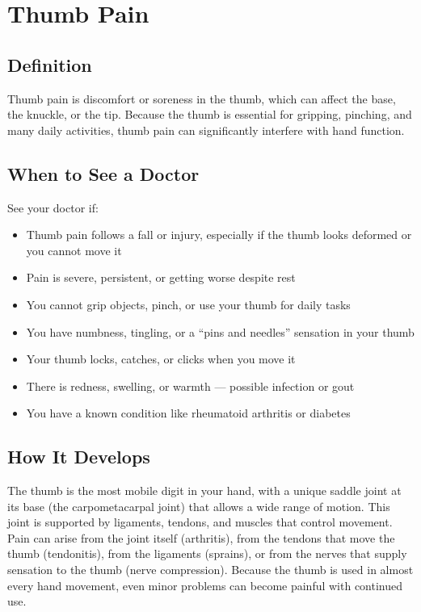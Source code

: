 \chapter{Thumb Pain}

\section*{Definition}
Thumb pain is discomfort or soreness in the thumb, which can affect the base, the knuckle, or the tip. Because the thumb is essential for gripping, pinching, and many daily activities, thumb pain can significantly interfere with hand function.

\section*{When to See a Doctor}
See your doctor if:
\begin{itemize}
  \item Thumb pain follows a fall or injury, especially if the thumb looks deformed or you cannot move it
  \item Pain is severe, persistent, or getting worse despite rest
  \item You cannot grip objects, pinch, or use your thumb for daily tasks
  \item You have numbness, tingling, or a ``pins and needles'' sensation in your thumb
  \item Your thumb locks, catches, or clicks when you move it
  \item There is redness, swelling, or warmth — possible infection or gout
  \item You have a known condition like rheumatoid arthritis or diabetes
\end{itemize}

\section*{How It Develops}
The thumb is the most mobile digit in your hand, with a unique saddle joint at its base (the carpometacarpal joint) that allows a wide range of motion. This joint is supported by ligaments, tendons, and muscles that control movement. Pain can arise from the joint itself (arthritis), from the tendons that move the thumb (tendonitis), from the ligaments (sprains), or from the nerves that supply sensation to the thumb (nerve compression). Because the thumb is used in almost every hand movement, even minor problems can become painful with continued use.

